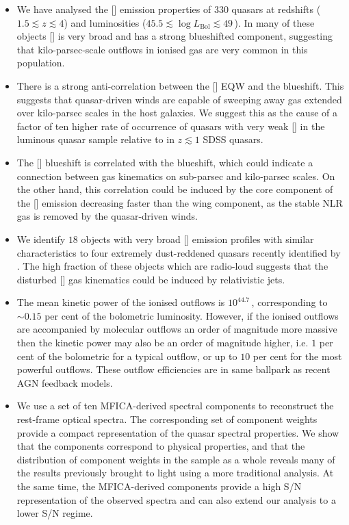\begin{itemize}

\item We have analysed the [] emission properties of $330$ quasars at redshifts ($1.5 \lesssim z \lesssim 4$) and luminosities ($45.5 \lesssim \log L_{\text{Bol}} \lesssim 49$\,\ergs). In many of these objects [] is very broad and has a strong blueshifted component, suggesting that kilo-parsec-scale outflows in ionised gas are very common in this population.

\item There is a strong anti-correlation between the [] EQW and the  blueshift. This suggests that quasar-driven winds are capable of sweeping away gas extended over kilo-parsec scales in the host galaxies. We suggest this as the cause of a factor of ten higher rate of occurrence of quasars with very weak [] in the luminous quasar sample relative to in $z \lesssim 1$ SDSS quasars.

\item The [] blueshift is correlated with the  blueshift, which could indicate a connection between gas kinematics on sub-parsec and kilo-parsec scales. On the other hand, this correlation could be induced by the core component of the [] emission decreasing faster than the wing component, as the stable NLR gas is removed by the quasar-driven winds.

\item We identify $18$ objects with very broad [] emission profiles with similar characteristics to four extremely dust-reddened quasars recently identified by \citet{zakamska16}. The high fraction of these objects which are radio-loud suggests that the disturbed [] gas kinematics could be induced by relativistic jets.

\item The mean kinetic power of the ionised outflows is $10^{44.7}$\,\ergs, corresponding to $\sim0.15$ per cent of the bolometric luminosity. However, if the ionised outflows are accompanied by molecular outflows an order of magnitude more massive then the kinetic power may also be an order of magnitude higher, i.e. $1$ per cent of the bolometric for a typical outflow, or up to $10$ per cent for the most powerful outflows. These outflow efficiencies are in same ballpark as recent AGN feedback models.

\item We use a set of ten MFICA-derived spectral components to reconstruct the rest-frame optical spectra. The corresponding set of component weights provide a compact representation of the quasar spectral properties. We show that the components correspond to physical properties, and that the distribution of component weights in the sample as a whole reveals many of the results previously brought to light using a more traditional analysis. At the same time, the MFICA-derived components provide a high S/N representation of the observed spectra and can also extend our analysis to a lower S/N regime.

\end{itemize}

